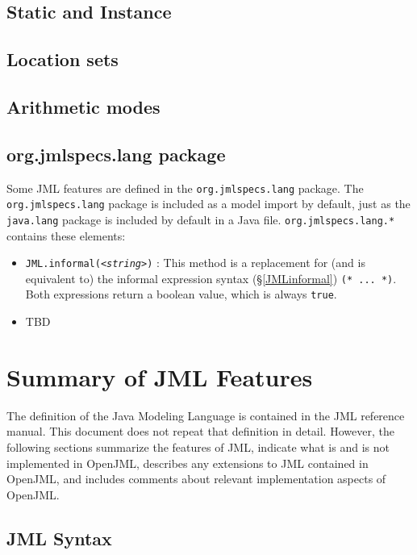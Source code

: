 \section{Static and Instance}

\section{Location sets}

\section{Arithmetic modes}

\section{org.jmlspecs.lang package}
\label{JMLlang}

Some JML features are defined in the \texttt{org.jmlspecs.lang} package. The \texttt{org.jmlspecs.lang} package is included as a model import by default, just as the \texttt{java.lang} package is included by default in a Java file. \texttt{org.jmlspecs.lang.*}
contains these elements:
\begin{itemize}
\item \texttt{JML.informal(\textit{<string>}\texttt{)}} : This method is a replacement for (and is equivalent to) the informal expression syntax (\S\ref{JMLinformal}) \texttt{(* ... *)}. Both expressions return a boolean value, which is always \texttt{true}.

\item TBD

\end{itemize}

\chapter{Summary of JML Features}

The definition of the Java Modeling Language is contained in the JML reference manual.\cite{TBD}
This document does not repeat that definition in detail. However, the following sections summarize the features of JML, indicate what is and is not implemented in OpenJML, describes any extensions to JML contained in OpenJML, and includes
comments about relevant implementation aspects of OpenJML.

\section{JML Syntax}

